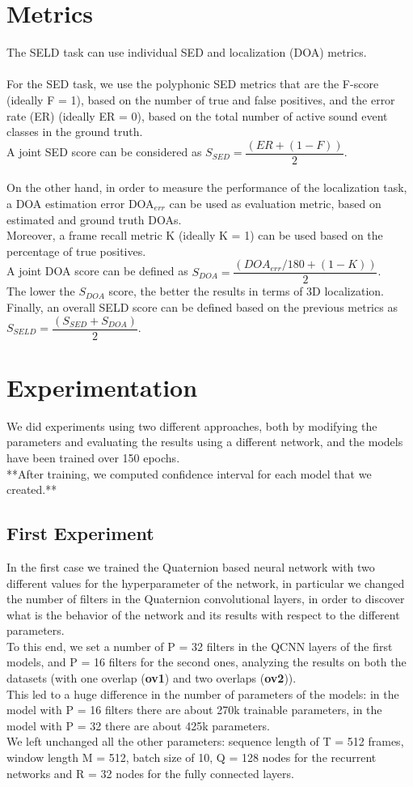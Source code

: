 \documentclass{article}
\begin{document}
    \section{Metrics}
    The SELD task can use individual SED and localization (DOA) metrics.
    \\ \\ For the SED task, we use the polyphonic SED metrics that are the F-score (ideally F = 1), based on the number of true and false positives, and the error rate (ER) (ideally ER = 0), based on the total number of active sound event classes in the ground truth.\\
    A joint SED score can be considered as $S_{SED} = \dfrac{(ER+(1-F))}{2}$.
    \\ \\ On the other hand, in order to measure the performance of the localization task, a DOA estimation error DOA$_{err}$ can be used as evaluation metric, based on estimated and ground truth DOAs.\\ Moreover, a frame recall metric K (ideally K = 1) can be used based on the percentage of true positives. \\
    A joint DOA score can be defined as $S_{DOA} = \dfrac{(DOA_{err}/180 + (1 - K))}{2}$.\\
    The lower the $S_{DOA}$ score, the better the results in terms of 3D localization.
    Finally, an overall SELD score can be defined based on the previous metrics as $S_{SELD} = \dfrac{(S_{SED} + S_{DOA})}{2}$.
    \section{Experimentation}
    We did experiments using two different approaches, both by modifying the parameters and evaluating the results using a different network, and the models have been trained over 150 epochs.\\
    **After training, we computed confidence interval for each model that we created.**
    \subsection*{First Experiment}
    In the first case we trained the Quaternion based neural network with two different values for the hyperparameter of the network, in particular we changed the number of filters in the Quaternion convolutional layers, in order to discover what is the behavior of the network and its results with respect to the different parameters.\\
    To this end, we set a number of P = 32 filters in the QCNN layers of the first models, and P = 16 filters for the second ones, analyzing the results on both the datasets (with one overlap (\textbf{ov1}) and two overlaps (\textbf{ov2})).\\
    This led to a huge difference in the number of parameters of the models: in the model with P = 16 filters there are about 270k trainable parameters, in the model with P = 32 there are about 425k parameters.\\
    We left unchanged all the other parameters: sequence length of T = 512 frames, window length M = 512, batch size of 10, Q = 128 nodes for the recurrent networks and R = 32 nodes for the fully connected layers.
\end{document}
